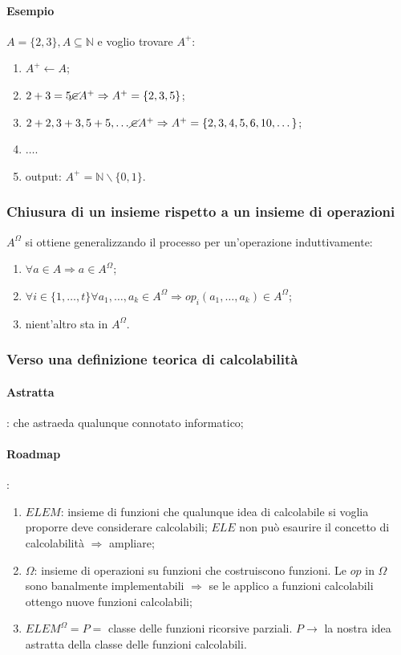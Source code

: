 \documentclass{article}
\begin{document}
\paragraph{Esempio}
$A=\{2,3\}, A \subseteq \mathbb{N}$ e voglio trovare $A^+$:
\begin{enumerate}
	\item $A^+ \leftarrow A$;
	\item $2+3=5 \cancel{\in} A^+ \Rightarrow A^+=\{2,3,5\}$;
	\item $2+2,3+3, 5+5, \dots \cancel{\in} A^+ \Rightarrow A^+=\{2,3,4,5,6,10, \dots \}$;
	\item $\dots$.
	\item output: $A^+ = \mathbb{N} \backslash \{0,1\}$.
\end{enumerate}

\subsubsection{Chiusura di un insieme rispetto a un insieme di operazioni}
$A^\Omega$ si ottiene generalizzando il processo per un'operazione induttivamente:
\begin{enumerate}
	\item $\forall a \in A \Rightarrow a \in A^{\Omega}$;
	\item $\forall i \in \{ 1,\dots,t \} \forall a_1, \dots, a_k \in A^{\Omega} \Rightarrow op_i(a_1, \dots, a_k) \in A^{\Omega}$;
	\item nient'altro sta in $A^{\Omega}$.
\end{enumerate}

\subsubsection{Verso una definizione teorica di calcolabilità}
\paragraph{Astratta}: che astraeda qualunque connotato informatico;




\paragraph{Roadmap}:
\begin{enumerate}

	\item $ELEM$: insieme di funzioni che qualunque idea di calcolabile si voglia proporre deve considerare calcolabili; $ELE$ non può esaurire il concetto di calcolabilità $\Rightarrow$ ampliare;
	\item $\Omega$: insieme di operazioni su funzioni che costruiscono funzioni. Le $op$ in $\Omega$ sono banalmente implementabili $\Rightarrow$ se le applico a funzioni calcolabili ottengo nuove funzioni calcolabili;
	\item $ELEM^\Omega = P =$ classe delle funzioni ricorsive parziali. $P \rightarrow$ la nostra idea astratta della classe delle funzioni calcolabili.


\end{enumerate}
	
\end{document}
